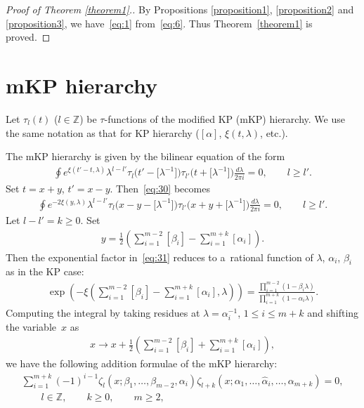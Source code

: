\documentclass[pdftex]{sigma}
\begin{document}
\begin{proof}[Proof of Theorem \ref{theorem1}.] By Propositions \ref{proposition1}, \ref{proposition2} and \ref{proposition3}, we have~\eqref{eq:1} from~\eqref{eq:6}.
Thus Theorem~\ref{theorem1} is proved.
\end{proof}

\section{mKP hierarchy}\label{section3}

Let $\tau_l(t)$ ($l\in\mathbb{Z}$) be $\tau$-functions of the modif\/ied KP (mKP) hierarchy.
We use the same notation as that for KP hierarchy ($[\alpha]$, $\xi(t,\lambda)$, etc.).

The mKP hierarchy is given by the bilinear equation \cite{DJKM1,JM1} of the form
\begin{gather}
\oint e^{\xi(t'-t,\lambda)}\lambda^{l-l'}\tau_l\big(t'-\big[\lambda^{-1}\big]\big)\tau_{l'}
\big(t+\big[\lambda^{-1}\big]\big)\frac{d\lambda}
{2\pi i}=0,\qquad l\ge l'.
\label{eq:30}
\end{gather}
Set $t=x+y$, $t'=x-y$.
Then~\eqref{eq:30} becomes
\begin{gather}
\oint e^{-2\xi(y,\lambda)}\lambda^{l-l'}\tau_l\big(x-y-\big[\lambda^{-1}\big]\big)
\tau_{l'}\big(x+y+\big[\lambda^{-1}\big]\big)\frac{d\lambda}{2\pi i}=0,\qquad l\ge l'.
\label{eq:31}
\end{gather}
Let $l-l'=k\ge0$.
Set
\begin{gather*}
y=\frac{1}{2}\left(\sum_{i=1}^{m-2}[\beta_i]-\sum_{i=1}^{m+k}[\alpha_i]\right).
\end{gather*}
Then the exponential factor in~\eqref{eq:31} reduces to a~rational function of $\lambda$, $\alpha_i$, $\beta_i$
as in the KP case:
\begin{gather*}
\exp\left(-\xi\left(\sum_{i=1}^{m-2}[\beta_i]-\sum_{i=1}^{m+k}
[\alpha_i],\lambda\right)\right)=\frac{\prod\limits_{i=1}^{m-2}(1-\beta_i\lambda)}{\prod\limits_{i=1}^{m+k}
(1-\alpha_i\lambda)}.
\end{gather*}
Computing the integral by taking residues at $\lambda=\alpha_i^{-1}$, $1\le i\le m+k$ and shifting the
va\-riab\-le~$x$ as
\begin{gather*}
x\rightarrow x+\frac{1}{2}\left(\sum_{i=1}^{m-2}[\beta_i]+\sum_{i=1}^{m+k}[\alpha_i]\right),
\end{gather*}
we have the following addition formulae of the mKP hierarchy:
\begin{gather}
\sum_{i=1}^{m+k}(-1)^{i-1}\zeta_l(x;\beta_1,\dots,\beta_{m-2},\alpha_i)\zeta_{l+k}
(x;\alpha_1,\dots,\hat{\alpha}_i,\dots,\alpha_{m+k})=0,
\nonumber
\\
\qquad
l\in\mathbb{Z},\qquad k\ge0,\qquad m\ge2,
\label{eq:32}
\end{gather}
\end{document}
